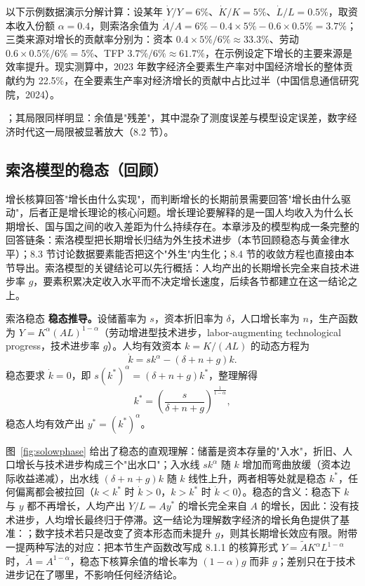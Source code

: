 以下示例数据演示分解计算：设某年 $\dot Y/Y = 6\%$、$\dot K/K = 5\%$、$\dot L/L = 0.5\%$，取资本收入份额 $\alpha = 0.4$，则索洛余值为 $\dot A/A = 6\% - 0.4\times 5\% - 0.6\times 0.5\% = 3.7\%$；三类来源对增长的贡献率分别为：资本 $0.4\times 5\%/6\% \approx 33.3\%$、劳动 $0.6\times 0.5\%/6\% = 5\%$、TFP $3.7\%/6\% \approx 61.7\%$，在示例设定下增长的主要来源是效率提升。现实测算中，2023 年数字经济全要素生产率对中国经济增长的整体贡献约为 22.5\%，在全要素生产率对经济增长的贡献中占比过半（中国信息通信研究院，2024）。

；其局限同样明显：余值是"残差"，其中混杂了测度误差与模型设定误差，数字经济时代这一局限被显著放大（8.2 节）。

\subsection{索洛模型的稳态（回顾）}

增长核算回答"增长由什么实现"，而判断增长的长期前景需要回答"增长由什么驱动"，后者正是增长理论的核心问题。增长理论要解释的是一国人均收入为什么长期增长、国与国之间的收入差距为什么持续存在。本章涉及的模型构成一条完整的回答链条：索洛模型把长期增长归结为外生技术进步（本节回顾稳态与黄金律水平）；8.3 节讨论数据要素能否把这个"外生"内生化；8.4 节的收敛方程也直接由本节导出。索洛模型的关键结论可以先行概括：人均产出的长期增长完全来自技术进步率 $g$，要素积累决定收入水平而不决定增长速度，后续各节都建立在这一结论之上。

\begin{derivation}{索洛稳态}{}
\textbf{稳态推导。}设储蓄率为 $s$，资本折旧率为 $\delta$，人口增长率为 $n$，生产函数为 $Y = K^\alpha (AL)^{1-\alpha}$（劳动增进型技术进步，labor-augmenting technological progress，技术进步率 $g$）。人均有效资本 $k = K/(AL)$ 的动态方程为
\[
\dot k = s k^\alpha - (\delta + n + g) k.
\]
稳态要求 $\dot k = 0$，即 $s (k^*)^\alpha = (\delta+n+g) k^*$，整理解得
\[
k^* = \left(\frac{s}{\delta + n + g}\right)^{\frac{1}{1-\alpha}},
\]
稳态人均有效产出 $y^* = (k^*)^\alpha$。
\end{derivation}

图~\ref{fig:solowphase} 给出了稳态的直观理解：储蓄是资本存量的"入水"，折旧、人口增长与技术进步构成三个"出水口"；入水线 $sk^\alpha$ 随 $k$ 增加而弯曲放缓（资本边际收益递减），出水线 $(\delta+n+g)k$ 随 $k$ 线性上升，两者相等处就是稳态 $k^*$，任何偏离都会被拉回（$k<k^*$ 时 $\dot k>0$，$k>k^*$ 时 $\dot k<0$）。稳态的含义：稳态下 $k$ 与 $y$ 都不再增长，人均产出 $Y/L = A y^*$ 的增长完全来自 $A$ 的增长，因此：没有技术进步，人均增长最终归于停滞。这一结论为理解数字经济的增长角色提供了基准：；数字技术若只是改变了资本形态而未提升 $g$，则其长期增长效应有限。附带一提两种写法的对应：把本节生产函数改写成 8.1.1 的核算形式 $Y = \tilde A K^\alpha L^{1-\alpha}$ 时，$\tilde A = A^{1-\alpha}$，稳态下核算余值的增长率为 $(1-\alpha)g$ 而非 $g$；差别只在于技术进步记在了哪里，不影响任何经济结论。

